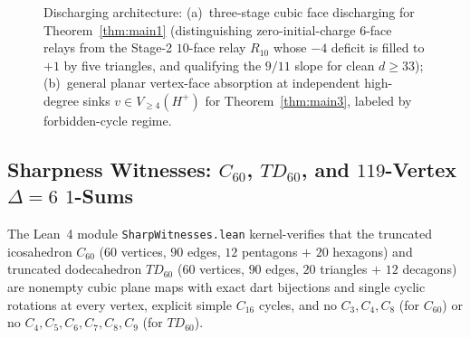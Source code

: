 \documentclass[11pt,reqno]{amsart}
\theoremstyle{plain}
\theoremstyle{definition}
\theoremstyle{remark}
\newcommand{\chf}{\mathrm{ch}_{\mathrm{fin}}}
\newcommand{\Vge}{V_{\ge 4}}
\DeclareRobustCommand{\_}{\ifmmode\text{\textunderscore}\else\textunderscore\allowbreak\fi}
\begin{document}
\begin{figure}[t]
\caption{Discharging architecture: (a)~three-stage cubic face discharging for Theorem~\ref{thm:main1} (distinguishing zero-initial-charge $6$-face relays from the Stage-2 $10$-face relay $R_{10}$ whose $-4$ deficit is filled to $+1$ by five triangles, and qualifying the $9/11$ slope for clean $d \ge 33$); (b)~general planar vertex-face absorption at independent high-degree sinks $v \in \Vge(H^+)$ for Theorem~\ref{thm:main3}, labeled by forbidden-cycle regime.}\label{fig:discharging}
\end{figure}

\subsection{Sharpness Witnesses: \texorpdfstring{$C_{60}$, $TD_{60}$, and $119$-Vertex $\Delta = 6$ $1$-Sums}{C60, TD60, and 119-Vertex Delta=6 1-Sums}}\label{subsec:trilogy-sharp}

The Lean~4 module \texttt{SharpWitnesses.lean} kernel-verifies that the truncated icosahedron $C_{60}$ ($60$ vertices, $90$ edges, $12$ pentagons $+$ $20$ hexagons) and truncated dodecahedron $TD_{60}$ ($60$ vertices, $90$ edges, $20$ triangles $+$ $12$ decagons) are nonempty cubic plane maps with exact dart bijections and single cyclic rotations at every vertex, explicit simple $C_{16}$ cycles, and no $C_3, C_4, C_8$ (for $C_{60}$) or no $C_4, C_5, C_6, C_7, C_8, C_9$ (for $TD_{60}$).
\end{document}
